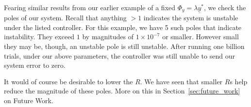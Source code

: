 Fearing similar results from our earlier example of a fixed $\Phi_y = \lambda \underline{y}^\ast$, we check the poles of our system. Recall that anything $> 1$ indicates the system is unstable under the listed controller. For this example, we have 5 such poles that indicate instability. They exceed $1$ by magnitudes of $1 \times 10^{-7}$ or smaller. However small they may be, though, an unstable pole is still unstable. After running one billion trials, under our above parameters, the controller was still unable to send our system error to zero.

It would of course be desirable to lower the $R$. We have seen that smaller $R$s help reduce the magnitude of these poles. More on this in Section~\ref{sec:future_work} on Future Work.
